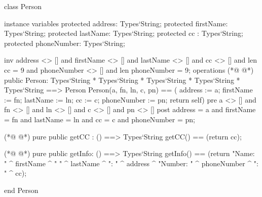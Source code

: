 \begin{vdmpp}[breaklines=true]
class Person

instance variables
  protected address: Types`String;
  protected firstName: Types`String;
  protected lastName: Types`String;
  protected cc : Types`String;
  protected phoneNumber: Types`String;
 
  inv address <> [] and firstName <> [] and lastName <> [] and cc <> [] and len cc = 9 and phoneNumber <> [] and len phoneNumber = 9;
operations
(*@
\label{Person:12}
@*)
 public Person: Types`String * Types`String * Types`String * Types`String * Types`String ==> Person
  Person(a, fn, ln, c, pn) == ( address := a; firstName := fn; lastName := ln; cc := c; phoneNumber := pn; return self)
 pre a <> [] and fn <> [] and ln <> [] and c <> [] and pn <> []
 post address = a and firstName = fn and lastName = ln and cc = c and phoneNumber = pn;
  
(*@
\label{getCC:17}
@*)
 pure public getCC : () ==> Types`String
  getCC() == (return cc);
  
(*@
\label{getInfo:20}
@*)
 pure public getInfo: () ==> Types`String
  getInfo() == (return "Name: " ^ firstName ^ " " ^ lastName ^ "\nAddress: " ^ address ^ "\nPhone Number: " ^ phoneNumber ^ "\nCC: " ^ cc);

end Person
\end{vdmpp}
